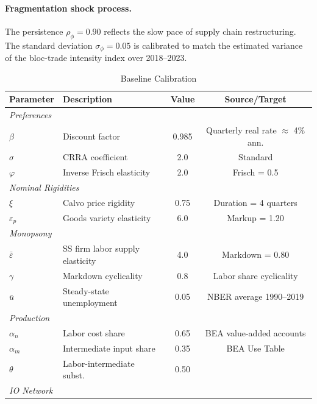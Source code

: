 \paragraph{Fragmentation shock process.}
The persistence $\rho_\phi = 0.90$ reflects the slow pace of supply chain
restructuring. The standard deviation $\sigma_\phi = 0.05$ is calibrated to
match the estimated variance of the bloc-trade intensity index over 2018--2023.

\begin{table}[htbp]
  \centering
  \caption{Baseline Calibration}
  \label{tab:calibration}
  \footnotesize
  \begin{tabular}{llcc}
    \toprule
    \textbf{Parameter} & \textbf{Description} & \textbf{Value} & \textbf{Source/Target} \\
    \midrule
    \multicolumn{4}{l}{\textit{Preferences}} \\
    $\beta$ & Discount factor & 0.985 & Quarterly real rate $\approx$ 4\% ann.\\
    $\sigma$ & CRRA coefficient & 2.0 & Standard \\
    $\varphi$ & Inverse Frisch elasticity & 2.0 & Frisch = 0.5 \citep{chetty2013} \\
    \midrule
    \multicolumn{4}{l}{\textit{Nominal Rigidities}} \\
    $\xi$ & Calvo price rigidity & 0.75 & Duration = 4 quarters \\
    $\varepsilon_p$ & Goods variety elasticity & 6.0 & Markup = 1.20 \citep{de2020rise} \\
    \midrule
    \multicolumn{4}{l}{\textit{Monopsony}} \\
    $\bar\varepsilon$ & SS firm labor supply elasticity & 4.0 & Markdown = 0.80 \citep{manning2021monopsony} \\
    $\gamma$ & Markdown cyclicality & 0.8 & Labor share cyclicality \citep{rinz2022labor} \\
    $\bar u$ & Steady-state unemployment & 0.05 & NBER average 1990--2019 \\
    \midrule
    \multicolumn{4}{l}{\textit{Production}} \\
    $\alpha_n$ & Labor cost share & 0.65 & BEA value-added accounts \\
    $\alpha_m$ & Intermediate input share & 0.35 & BEA Use Table \\
    $\theta$ & Labor-intermediate subst.\ & 0.50 & \citet{oberfield2014} \\
    \midrule
    \multicolumn{4}{l}{\textit{IO Network}} \\

\end{tabular}
\end{table}
